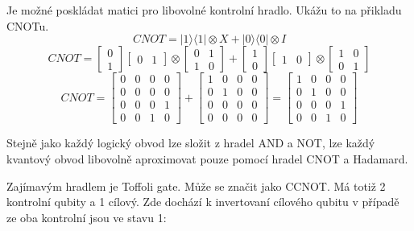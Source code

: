 \documentclass[11pt]{article}
\begin{document}
\par Je možné poskládat matici pro libovolné kontrolní hradlo. Ukážu to na přikladu CNOTu.
$$CNOT = |1 \rangle\langle 1| \otimes X + |0 \rangle\langle 0| \otimes I$$
$$CNOT = \begin{bmatrix}
        0 \\
        1
    \end{bmatrix}\begin{bmatrix}
        0 & 1
    \end{bmatrix} \otimes \begin{bmatrix}
        0 & 1 \\
        1 & 0
    \end{bmatrix} + \begin{bmatrix}
        1 \\
        0
    \end{bmatrix}\begin{bmatrix}
        1 & 0
    \end{bmatrix} \otimes \begin{bmatrix}
        1 & 0 \\
        0 & 1
    \end{bmatrix}$$
$$CNOT = \begin{bmatrix}
        0 & 0 & 0 & 0 \\
        0 & 0 & 0 & 0 \\
        0 & 0 & 0 & 1 \\
        0 & 0 & 1 & 0
    \end{bmatrix} + \begin{bmatrix}
        1 & 0 & 0 & 0 \\
        0 & 1 & 0 & 0 \\
        0 & 0 & 0 & 0 \\
        0 & 0 & 0 & 0
    \end{bmatrix} = \begin{bmatrix}
        1 & 0 & 0 & 0 \\
        0 & 1 & 0 & 0 \\
        0 & 0 & 0 & 1 \\
        0 & 0 & 1 & 0
    \end{bmatrix}$$

\par Stejně jako každý logický obvod lze složit z hradel AND a NOT, lze každý kvantový obvod libovolně aproximovat pouze pomocí hradel CNOT a Hadamard.
\par Zajímavým hradlem je Toffoli gate.
Může se značit jako CCNOT.
Má totiž 2 kontrolní qubity a 1 cílový.
Zde dochází k invertovaní cílového qubitu v případě ze oba kontrolní jsou ve stavu 1:
\end{document}
